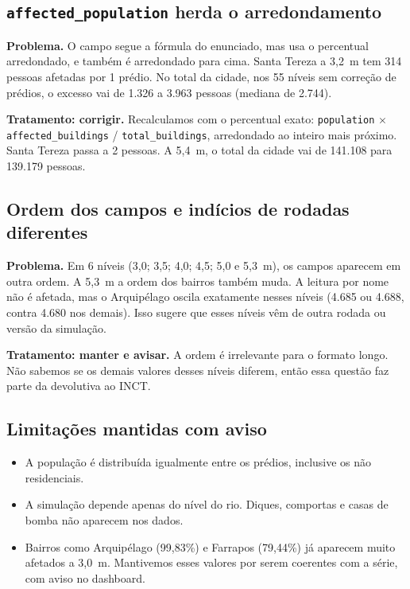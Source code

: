\documentclass[11pt,a4paper]{article}
\begin{document}
\subsection{\texttt{affected\_population} herda o arredondamento}
\textbf{Problema.} O campo segue a fórmula do enunciado, mas usa o percentual arredondado, e também é arredondado para cima. Santa Tereza a 3,2~m tem 314 pessoas afetadas por 1 prédio. No total da cidade, nos 55 níveis sem correção de prédios, o excesso vai de 1.326 a 3.963 pessoas (mediana de 2.744).

\textbf{Tratamento: corrigir.} Recalculamos com o percentual exato: \texttt{population} $\times$ \texttt{affected\_buildings} / \texttt{total\_buildings}, arredondado ao inteiro mais próximo. Santa Tereza passa a 2 pessoas. A 5,4~m, o total da cidade vai de 141.108 para 139.179 pessoas.

\subsection{Ordem dos campos e indícios de rodadas diferentes}\label{sec:rodadas}
\textbf{Problema.} Em 6 níveis (3,0; 3,5; 4,0; 4,5; 5,0 e 5,3~m), os campos aparecem em outra ordem. A 5,3~m a ordem dos bairros também muda. A leitura por nome não é afetada, mas o Arquipélago oscila exatamente nesses níveis (4.685 ou 4.688, contra 4.680 nos demais). Isso sugere que esses níveis vêm de outra rodada ou versão da simulação.

\textbf{Tratamento: manter e avisar.} A ordem é irrelevante para o formato longo. Não sabemos se os demais valores desses níveis diferem, então essa questão faz parte da devolutiva ao INCT.

\subsection{Limitações mantidas com aviso}
\begin{itemize}
  \item A população é distribuída igualmente entre os prédios, inclusive os não residenciais.
  \item A simulação depende apenas do nível do rio. Diques, comportas e casas de bomba não aparecem nos dados.
  \item Bairros como Arquipélago (99,83\%) e Farrapos (79,44\%) já aparecem muito afetados a 3,0~m. Mantivemos esses valores por serem coerentes com a série, com aviso no dashboard.
\end{itemize}
\end{document}
